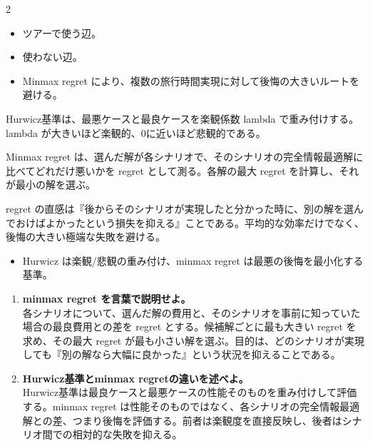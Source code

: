\clearpage
{}
\begin{multicols}{2}\footnotesize\raggedcolumns
{}
\begin{itemize}
\item ツアーで使う辺。
\item 使わない辺。
\item Minmax regret により、複数の旅行時間実現に対して後悔の大きいルートを避ける。
\end{itemize}
Hurwicz基準は、最悪ケースと最良ケースを楽観係数 lambda で重み付けする。lambda が大きいほど楽観的、0に近いほど悲観的である。\par

Minmax regret は、選んだ解が各シナリオで、そのシナリオの完全情報最適解に比べてどれだけ悪いかを regret として測る。各解の最大 regret を計算し、それが最小の解を選ぶ。\par

regret の直感は『後からそのシナリオが実現したと分かった時に、別の解を選んでおけばよかったという損失を抑える』ことである。平均的な効率だけでなく、後悔の大きい極端な失敗を避ける。\par
{}
\begin{itemize}
\item Hurwicz は楽観/悲観の重み付け、minmax regret は最悪の後悔を最小化する基準。
\end{itemize}
\begin{enumerate}
\item \textbf{minmax regret を言葉で説明せよ。}\\各シナリオについて、選んだ解の費用と、そのシナリオを事前に知っていた場合の最良費用との差を regret とする。候補解ごとに最も大きい regret を求め、その最大 regret が最も小さい解を選ぶ。目的は、どのシナリオが実現しても『別の解なら大幅に良かった』という状況を抑えることである。
\item \textbf{Hurwicz基準とminmax regretの違いを述べよ。}\\Hurwicz基準は最良ケースと最悪ケースの性能そのものを重み付けして評価する。minmax regret は性能そのものではなく、各シナリオの完全情報最適解との差、つまり後悔を評価する。前者は楽観度を直接反映し、後者はシナリオ間での相対的な失敗を抑える。
\end{enumerate}
\end{multicols}

